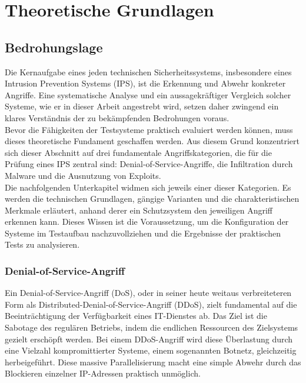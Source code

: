 \chapter{Theoretische Grundlagen}

\section{Bedrohungslage}
Die Kernaufgabe eines jeden technischen Sicherheitssystems, insbesondere eines Intrusion Prevention Systems (IPS), ist die Erkennung und Abwehr konkreter Angriffe. Eine systematische Analyse und ein aussagekräftiger Vergleich solcher Systeme, wie er in dieser Arbeit angestrebt wird, setzen daher zwingend ein klares Verständnis der zu bekämpfenden Bedrohungen voraus.\\

 Bevor die Fähigkeiten der Testsysteme praktisch evaluiert werden können, muss dieses theoretische Fundament geschaffen werden. Aus diesem Grund konzentriert sich dieser Abschnitt auf drei fundamentale Angriffskategorien, die für die Prüfung eines IPS zentral sind: Denial-of-Service-Angriffe, die Infiltration durch Malware und die Ausnutzung von Exploits. \\
  Die nachfolgenden Unterkapitel widmen sich jeweils einer dieser Kategorien. Es werden die technischen Grundlagen, gängige Varianten und die charakteristischen Merkmale erläutert, anhand derer ein Schutzsystem den jeweiligen Angriff erkennen kann. Dieses Wissen ist die Voraussetzung, um die Konfiguration der Systeme im Testaufbau nachzuvollziehen und die Ergebnisse der praktischen Tests zu analysieren. \cite{cloudflare1}
  
  
\subsection{Denial-of-Service-Angriff}

Ein Denial-of-Service-Angriff (DoS), oder in seiner heute weitaus verbreiteteren Form als Distributed-Denial-of-Service-Angriff (DDoS), zielt fundamental auf die Beeinträchtigung der Verfügbarkeit eines IT-Dienstes ab. Das Ziel ist die Sabotage des regulären Betriebs, indem die endlichen Ressourcen des Zielsystems gezielt erschöpft werden. Bei einem DDoS-Angriff wird diese Überlastung durch eine Vielzahl kompromittierter Systeme, einem sogenannten Botnetz, gleichzeitig herbeigeführt. Diese massive Parallelisierung macht eine simple Abwehr durch das Blockieren einzelner IP-Adressen praktisch unmöglich.\\

